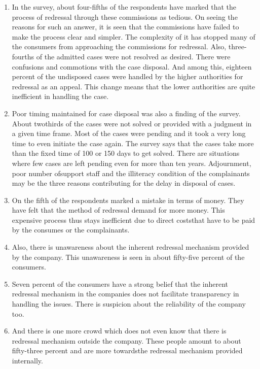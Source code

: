 \begin{multicols}{2}
\begin{enumerate}[label=$\bullet$]
\item In the survey, about four-fifths of the respondents have marked that the process of
redressal through these commissions as tedious. On seeing the reasons for such an
answer, it is seen that the commissions have failed to make the process clear and
simpler. The complexity of it has stopped many of the consumers from approaching the
commissions for redressal. Also, three-fourths of the admitted cases were not resolved
as desired. There were confusions and commotions with the case disposal. And among
this, eighteen percent of the undisposed cases were handled by the higher authorities
for redressal as an appeal. This change means that the lower authorities are quite
inefficient in handling the case.

\item Poor timing maintained for case disposal was also a finding of the survey. About twothirds of the cases were not solved or provided with a judgment in a given time frame.
Most of the cases were pending and it took a very long time to even initiate the case
again. The survey says that the cases take more than the fixed time of 100 or 150 days
to get solved. There are situations where few cases are left pending even for more than
ten years. Adjournment, poor number ofsupport staff and the illiteracy condition of the
complainants may be the three reasons contributing for the delay in disposal of cases.

\item On the fifth of the respondents marked a mistake in terms of money. They have felt that
the method of redressal demand for more money. This expensive process thus stays
inefficient due to direct coststhat have to be paid by the consumes or the complainants.

\item Also, there is unawareness about the inherent redressal mechanism provided by the
company. This unawareness is seen in about fifty-five percent of the consumers.

\item Seven percent of the consumers have a strong belief that the inherent redressal
mechanism in the companies does not facilitate transparency in handling the issues.
There is suspicion about the reliability of the company too.

\item And there is one more crowd which does not even know that there is redressal
mechanism outside the company. These people amount to about fifty-three percent and
are more towardsthe redressal mechanism provided internally.


\end{enumerate}
\end{multicols}
